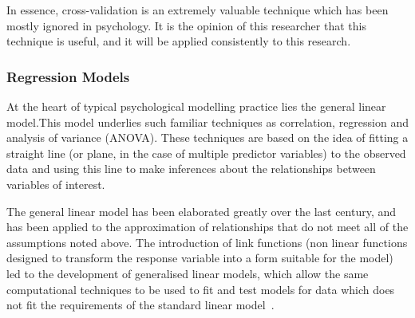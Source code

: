 In essence, cross-validation is an extremely valuable technique which has been mostly ignored in psychology. It is the opinion of this researcher  that this technique is useful, and it will be applied consistently to this research.

\subsubsection{Regression Models}
\label{sec:regress-models}

At the heart of typical psychological modelling practice lies the general linear model.This model underlies such familiar techniques as correlation, regression and analysis of variance (ANOVA)\cite{gelman2007data}. These techniques are based on the idea of fitting a straight line (or plane, in the case of multiple predictor variables) to the observed data and using this line to make inferences about the relationships between variables of interest.




The general linear model has been elaborated greatly over the last century, and has been applied to the approximation of relationships that do not meet all of the assumptions noted above\cite{gelman2007data}. The introduction of link functions (non linear functions designed to transform the response variable into a form suitable for the model)  led to the development of generalised linear models, which allow the same computational techniques to be used to fit and test models for data which does not fit the requirements of the standard linear model~\cite{mccullagh1989generalized}.

